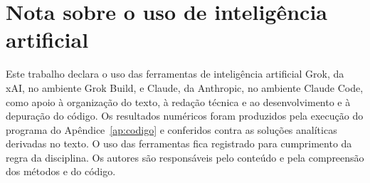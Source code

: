 \section*{Nota sobre o uso de inteligência artificial}

Este trabalho declara o uso das ferramentas de inteligência artificial Grok, da xAI, no ambiente Grok Build, e Claude, da Anthropic, no ambiente Claude Code, como apoio à organização do texto, à redação técnica e ao desenvolvimento e à depuração do código. Os resultados numéricos foram produzidos pela execução do programa do Apêndice~\ref{ap:codigo} e conferidos contra as soluções analíticas derivadas no texto. O uso das ferramentas fica registrado para cumprimento da regra da disciplina. Os autores são responsáveis pelo conteúdo e pela compreensão dos métodos e do código.
